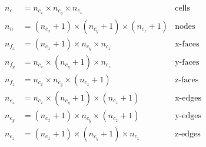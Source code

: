 \begin{equation}
\begin{aligned}
n_c &= n_{c_x} \times n_{c_y} \times n_{c_z}                    & \text{cells}\\
n_n &= (n_{c_x} + 1) \times (n_{c_y} + 1) \times (n_{c_z} +1)   & \text{nodes}\\
n_{f_x} &= (n_{c_x} + 1) \times n_{c_y} \times n_{c_z}          & \text{x-faces}\\
n_{f_y} &= n_{c_x} \times (n_{c_y} + 1) \times n_{c_z}          & \text{y-faces}\\
n_{f_z} &= n_{c_x} \times n_{c_y} \times (n_{c_z} + 1)          & \text{z-faces}\\
n_{e_x} &= n_{c_x} \times (n_{c_y} + 1) \times (n_{c_z} + 1)    & \text{x-edges}\\
n_{e_y} &= (n_{c_x} + 1) \times n_{c_y} \times (n_{c_z} + 1)    & \text{y-edges}\\
n_{e_z} &= (n_{c_x} + 1) \times (n_{c_y} + 1) \times n_{c_z}    & \text{z-edges}\\
\end{aligned}
\end{equation}
